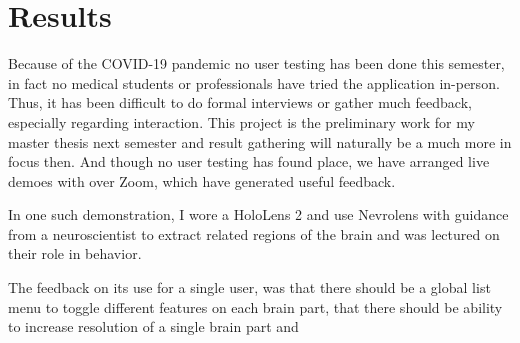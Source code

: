 


\chapter{Results}


Because of the COVID-19 pandemic no user testing has been done this semester, in fact no medical students or professionals have tried the application in-person. Thus, it has been difficult to do formal interviews or gather much feedback, especially regarding interaction. This project is the preliminary work for my master thesis next semester and result gathering will naturally be a much more in focus then. And though no user testing has found place, we have arranged live demoes with  over Zoom, which have generated useful feedback. 

In one such demonstration, I wore a HoloLens 2 and use Nevrolens with guidance from a neuroscientist to extract related regions of the brain and was lectured on their role in behavior. 

The feedback on its use for a single user, was that there should be a global list menu to toggle different features on each brain part, that there should be ability to increase resolution of a single brain part and 





